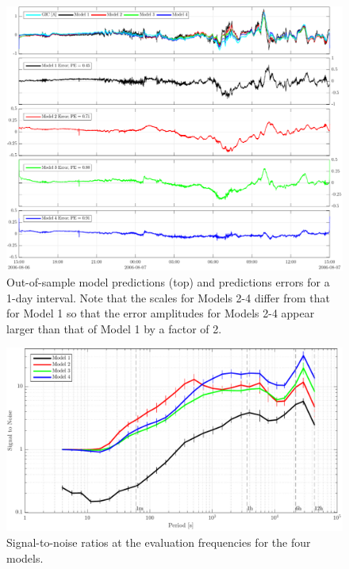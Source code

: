 \documentclass[draft,linenumbers]{agujournal2018}
\begin{document}
\begin{figure}[h]
\centering
\includegraphics[width=\textwidth]{figures/plot_model_predictions-MeanModel-20060806T150000.pdf}
\caption{Out-of-sample model predictions (top) and predictions errors for a 1-day interval. Note that the scales for Models 2-4 differ from that for Model 1 so that the error amplitudes for Models 2-4 appear larger than that of Model 1 by a factor of 2.}
\label{predictions}
\end{figure}

\begin{figure}[h]
\centering
\includegraphics[width=\textwidth]{figures/plot_model_summary_SN-options-1.pdf}
\caption{Signal-to-noise ratios at the evaluation frequencies for the four models.}
\label{SN}
\end{figure}
\end{document}
